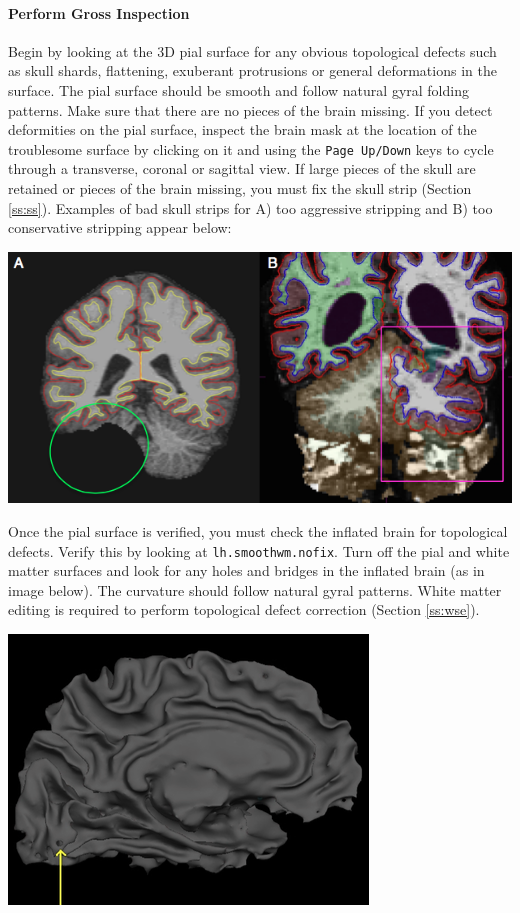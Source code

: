 \documentclass[paper=a4, fontsize=11pt]{scrartcl} %
\numberwithin{equation}{section} %
\numberwithin{figure}{section} %
\numberwithin{table}{section} %
\begin{document}
\paragraph{Perform Gross Inspection} Begin by looking at the 3D pial surface for any obvious topological defects such as skull shards, flattening, exuberant protrusions or general deformations in the surface.  The pial surface should be smooth and follow natural gyral folding patterns.  Make sure that there are no pieces of the brain missing.  If you detect deformities on the pial surface, inspect the brain mask at the location of the troublesome surface by clicking on it and using the \texttt{Page Up/Down} keys to cycle through a transverse, coronal or sagittal view. If large pieces of the skull are retained or pieces of the brain missing, you must fix the skull strip (Section \ref{ss:ss}).  Examples of bad skull strips for A) too aggressive stripping and B) too conservative stripping appear below:

\includegraphics[scale=0.6]{skullstrip.png}

Once the pial surface is verified, you must check the inflated brain for topological defects.  Verify this by looking at \texttt{lh.smoothwm.nofix}.  Turn off the pial and white matter surfaces and look for any holes and bridges in the inflated brain (as in image below).  The curvature should follow natural gyral patterns.  White matter editing is required to perform topological defect correction (Section \ref{ss:wse}). 

\includegraphics[scale=0.6]{topo.png}
\end{document}
